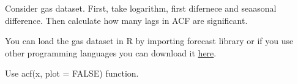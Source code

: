 
\begin{question}
Consider gas dataset. First, take logarithm, first difernece and seaasonal difference. Then calculate how many lags in ACF are significant.

You can load the gas dataset in R by importing forecast library or if you use other programming languages you can download it \href{https://github.com/vincentarelbundock/Rdatasets/blob/master/csv/forecast/gas.csv}{here}.
\end{question}

\begin{solution}
Use acf(x, plot = FALSE) function.
\end{solution}

